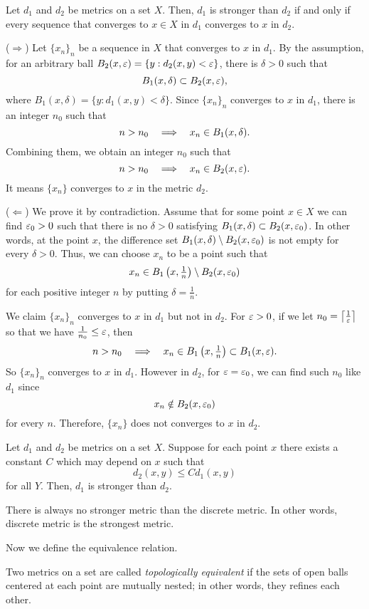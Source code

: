 \documentclass{../note}
\begin{document}
\begin{prop}
Let $d_1$ and $d_2$ be metrics on a set $X$.
Then, $d_1$ is stronger than $d_2$ if and only if every sequence that converges to $x\in X$ in $d_1$ converges to $x$ in $d_2$.
\end{prop}
\begin{pf}
($\Rightarrow$)
Let $\{x_n\}_n$ be a sequence in $X$ that converges to $x$ in $d_1$.
By the assumption, for an arbitrary ball $B_2(x,\varepsilon)=\{y:d_2(x,y)<\varepsilon\}$, there is $\delta>0$ such that
\[B_1(x,\delta)\subset B_2(x,\varepsilon),\]
where $B_1(x,\delta)=\{y:d_1(x,y)<\delta\}$.
Since $\{x_n\}_n$ converges to $x$ in $d_1$, there is an integer $n_0$ such that
\[n>n_0\impl x_n\in B_1(x,\delta).\]
Combining them, we obtain an integer $n_0$ such that
\[n>n_0\impl x_n\in B_2(x,\e).\]
It means $\{x_n\}$ converges to $x$ in the metric $d_2$.

($\Leftarrow$)
We prove it by contradiction.
Assume that for some point $x\in X$ we can find $\varepsilon_0>0$ such that there is no $\delta>0$ satisfying $B_1(x,\delta)\subset B_2(x,\varepsilon_0)$.
In other words, at the point $x$, the difference set $B_1(x,\delta)\setminus B_2(x,\varepsilon_0)$ is not empty for every $\delta>0$.
Thus, we can choose $x_n$ to be a point such that
\[x_n\in B_1\left(x,\tfrac1n\right)\setminus B_2(x,\varepsilon_0)\]
for each positive integer $n$ by putting $\delta=\frac1n$.

We claim $\{x_n\}_n$ converges to $x$ in $d_1$ but not in $d_2$.
For $\varepsilon>0$, if we let $n_0=\left\lceil\frac1{\varepsilon}\right\rceil$ so that we have $\frac1{n_0}\le\varepsilon$, then
\[n>n_0\impl x_n\in B_1\left(x,\tfrac1n\right)\subset B_1(x,\e).\]
So $\{x_n\}_n$ converges to $x$ in $d_1$.
However in $d_2$, for $\varepsilon=\varepsilon_0$, we can find such $n_0$ like $d_1$ since
\[x_n\notin B_2(x,\varepsilon_0)\]
for every $n$.
Therefore, $\{x_n\}$ does not converges to $x$ in $d_2$.
\end{pf}

\begin{ex}
Let $d_1$ and $d_2$ be metrics on a set $X$.
Suppose for each point $x$ there exists a constant $C$ which may depend on $x$ such that
\[d_2(x,y)\le Cd_1(x,y)\]
for all $Y$.
Then, $d_1$ is stronger than $d_2$.
\end{ex}
\begin{ex}
There is always no stronger metric than the discrete metric.
In other words, discrete metric is the strongest metric.
\end{ex}

Now we define the equivalence relation.

\begin{defn}
Two metrics on a set are called \emph{topologically equivalent} if the sets of open balls centered at each point are mutually nested; in other words, they refines each other.
\end{defn}
\end{document}
